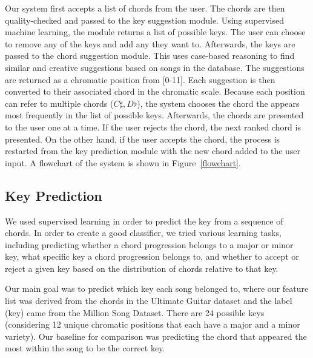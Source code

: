 \documentclass[letterpaper]{article}
\begin{document}
Our system first accepts a list of chords from the user. The chords are then quality-checked and passed to the key suggestion module. Using supervised machine learning, the module returns a list of possible keys. The user can choose to remove any of the keys and add any they want to. Afterwards, the keys are passed to the chord suggestion module. This uses case-based reasoning to find similar and creative suggestions based on songs in the database. The suggestions are returned as a chromatic position from [0-11]. Each suggestion is then converted to their associated chord in the chromatic scale. Because each position can refer to multiple chords ($C\sharp, D\flat$), the system chooses the chord the appears most frequently in the list of possible keys. Afterwards, the chords are presented to the user one at a time. If the user rejects the chord, the next ranked chord is presented. On the other hand, if the user accepts the chord, the process is restarted from the key prediction module with the new chord added to the user input. A flowchart of the system is shown in Figure~\ref{flowchart}.


\subsection{Key Prediction}
We used supervised learning in order to predict the key from a sequence of chords.  In order to create a good classifier, we tried various learning tasks, including predicting whether a chord progression belongs to a major or minor key, what specific key a chord progression belongs to, and whether to accept or reject a given key based on the distribution of chords relative to that key.

Our main goal was to predict which key each song belonged to, where our feature list was derived from the chords in the Ultimate  Guitar dataset and the label (key) came from the Million Song Dataset.  There are 24 possible keys (considering 12 unique chromatic positions that each have a major and a minor variety).  Our baseline for comparison was predicting the chord that appeared the most within the song to be the correct key.  
\end{document}
